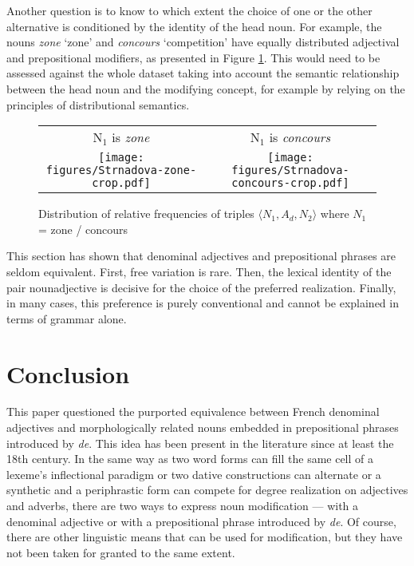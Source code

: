 \documentclass[output=paper]{LSP/langsci}
\begin{document}
Another question is to know to which extent the choice of one or the other alternative is conditioned by the identity of the head noun. For example, the nouns \emph{zone} `zone' and \emph{concours} `competition' have equally distributed adjectival and prepositional modifiers, as presented in Figure \ref{fig:Strnadova:zone-concours}. This would need to be assessed against the whole dataset taking into account the semantic relationship between the head noun and the modifying concept, for example by relying on the principles of distributional semantics.

\begin{figure}
\small
\begin{tabular}{cc}
N$_1$ is \emph{zone} 
&
N$_1$ is \emph{concours}\\
\texttt{[image: figures/Strnadova-zone-crop.pdf]}
&
\texttt{[image: figures/Strnadova-concours-crop.pdf]}
\end{tabular}

\caption{ Distribution of relative frequencies of triples $\langle N_1,A_d,N_2\rangle$ where $N_1$  =  zone / concours}
\label{fig:Strnadova:zone-concours}
\end{figure}

This section has shown that denominal adjectives and prepositional phrases are seldom equivalent. First, free variation is rare. Then, the lexical identity of the pair noun\rel{}adjective is decisive for the choice of the preferred realization. Finally, in many cases, this preference is purely conventional and cannot be explained in terms of grammar alone.

\section{Conclusion}

This paper questioned the purported equivalence between French denominal adjectives and morphologically related nouns embedded in prepositional phrases introduced by \emph{de}. This idea has been present in the literature since at least the 18th century. In the same way as two word forms can fill the same cell of a lexeme's inflectional paradigm or two dative constructions can alternate or a synthetic and a periphrastic form can compete for degree realization on adjectives and adverbs, there are two ways to express noun modification — with a denominal adjective or with a prepositional phrase introduced by \emph{de}. Of course, there are other linguistic means that can be used for modification, but they have not been taken for granted to the same extent.
\end{document}
